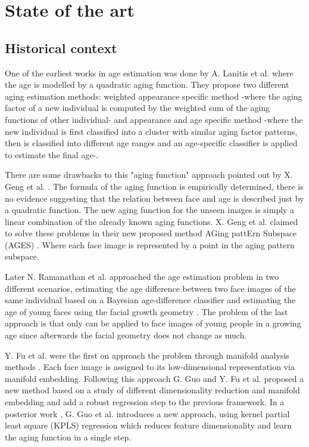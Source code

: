 \chapter{State of the art} \label{chap:sota}

\section{Historical context}
One of the earliest works in age estimation was done by A. Lanitis et al. \cite{Lanitis:2004:CDC:2225304.2226166, 791208, 993553} where the age is modelled by a quadratic aging function. They propose two different aging estimation methods: weighted appearance specific method \cite{791208, 993553}  -where the aging factor of a new individual is computed by the weighted sum of the aging functions of other individual- and appearance and age specific method \cite{Lanitis:2004:CDC:2225304.2226166} -where the new individual is first classified into a cluster with similar aging factor patterns, then is classified into different age ranges and an age-specific classifier is applied to estimate the final age-. 

There are some drawbacks to this "aging function" approach pointed out by X. Geng et al. \cite{Geng:2006:LFA:1180639.1180711}. The formula of the aging function is empirically determined, there is no evidence suggesting that the relation between face and age is described just by a quadratic function. The new aging function for the unseen images is simply a linear combination of the already known aging functions. X. Geng et al. claimed to solve these problems in their new proposed method AGing pattErn Subspace (AGES) \cite{Geng:2006:LFA:1180639.1180711}. Where each face image is represented by a point in the aging pattern subspace.

Later N. Ramanathan et al. \cite{1709980, 1640784} approached the age estimation problem in two different scenarios, estimating the age difference between two face images of the same individual based on a Bayesian age-difference classifier \cite{1709980} and estimating the age of young faces using the facial growth geometry \cite{1640784}. The problem of the last approach is that only can be applied to face images of young people in a growing age since afterwards the facial geometry does not change as much.

Y. Fu et al. were the first on approach the problem through manifold analysis methods \cite{4284917, 4523958}. Each face image is assigned to its low-dimensional representation via manifold embedding. Following this approach G. Guo and Y. Fu et al. \cite{4531189} proposed a new method based on a study of different dimensionality reduction and manifold embedding and add a robust regression step to the previous framework. In a posterior work \cite{5995404}, G. Guo et al. introduces a new approach, using kernel partial least square (KPLS) regression which reduces feature dimensionality and learn the aging function in a single step.

